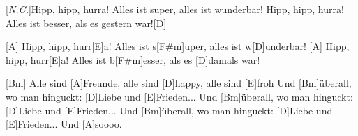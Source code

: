 \begin{guitar}
	[\textit{N.C.}]Hipp, hipp, hurra! Alles ist super, alles ist wunderbar!
	Hipp, hipp, hurra! Alles ist besser, als es gestern war![D]{}
	
	[A] Hipp, hipp, hurr[E]a! Alles ist s[F#m]uper, alles ist w[D]underbar!
	[A] Hipp, hipp, hurr[E]a! Alles ist b[F#m]esser, als es [D]damals war!
	
	[Bm] Alle sind [A]Freunde, alle sind [D]happy, alle sind [E]froh
	Und [Bm]{ü}berall, wo man hinguckt: [D]Liebe und [E]Frieden...
	Und [Bm]{ü}berall, wo man hinguckt: [D]Liebe und [E]Frieden...
	Und [Bm]{ü}berall, wo man hinguckt: [D]Liebe und [E]Frieden...
	Und [A]soooo.
	
\end{guitar}